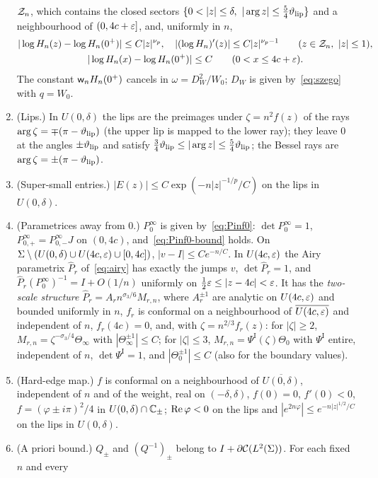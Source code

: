 \begin{proposition}
\begin{enumerate}
  $\Zn$, which contains the closed sectors $\{0<|z|\le\delta,\ |\arg z|\le\frac54\thlip\}$ and a neighbourhood of
  $(0,4c+\eps]$, and, uniformly in $n$,
  \begin{gather*}
    |\log H_n(z)-\log H_n(0^+)|\le C|z|^{\nu_p},\quad |(\log H_n)'(z)|\le C|z|^{\nu_p-1}\qquad(z\in\Zn,\ |z|\le1),\\
    |\log H_n(x)-\log H_n(0^+)|\le C\qquad(0<x\le4c+\eps).
  \end{gather*}
  The constant $\wn H_n(0^+)$ cancels in $\omega=D_W^2/W_0$; $D_W$ is given by~\eqref{eq:szego} with $q=W_0$.
\item[\Fi3] (Lips.) In $U(0,\delta)$ the lips are the preimages under $\zeta=n^2f(z)$ of the rays $\arg\zeta=\mp(\pi-\vartheta_{\mathrm{lip}})$
  (the upper lip is mapped to the lower ray); they leave $0$ at the angles $\pm\vartheta_{\mathrm{lip}}$ and satisfy
  $\frac34\vartheta_{\mathrm{lip}}\le|\arg z|\le\frac54\vartheta_{\mathrm{lip}}$; the Bessel rays are $\arg\zeta=\pm(\pi-\vartheta_{\mathrm{lip}})$.
\item[\Fi4] (Super-small entries.) $|E(z)|\le C\exp(-n|z|^{-1/p}/C)$ on the lips in $U(0,\delta)$.
\item[\Fi5] (Parametrices away from $0$.) $P^\infty_0$ is given by~\eqref{eq:Pinf0}: $\det P^\infty_0=1$, $P^\infty_{0,+}=
  P^\infty_{0,-}J$ on $(0,4c)$, and~\eqref{eq:Pinf0-bound} holds. On $\Sigma\setminus(U(0,\delta)\cup U(4c,\varepsilon)\cup[0,4c])$,
  $|v-I|\le Ce^{-n/C}$. In $U(4c,\varepsilon)$ the Airy parametrix $\hat P_r$ of~\eqref{eq:airy} has exactly the jumps $v$,
  $\det\hat P_r=1$, and $\hat P_r(P^\infty_0)^{-1}=I+O(1/n)$ uniformly on $\frac12\varepsilon\le|z-4c|<\varepsilon$. It has the
  \emph{two-scale structure} $\hat P_r=A_rn^{\sigma_3/6}M_{r,n}$, where $A_r^{\pm1}$ are analytic on $U(4c,\varepsilon)$ and bounded
  uniformly in $n$, $f_r$ is conformal on a neighbourhood of $\overline{U(4c,\varepsilon)}$ and independent of $n$, $f_r(4c)=0$, and,
  with $\zeta=n^{2/3}f_r(z)$: for $|\zeta|\ge2$, $M_{r,n}=\zeta^{-\sigma_3/4}\Theta_\infty$ with $|\Theta_\infty^{\pm1}|\le C$; for
  $|\zeta|\le3$, $M_{r,n}=\Psi^{\mathrm I}(\zeta)\Theta_0$ with $\Psi^{\mathrm I}$ entire, independent of $n$, $\det\Psi^{\mathrm I}=1$,
  and $|\Theta_0^{\pm1}|\le C$ (also for the boundary values).
\item[\Fi6] (Hard-edge map.) $f$ is conformal on a neighbourhood of $\overline{U(0,\delta)}$, independent of $n$ and of the
  weight, real on $(-\delta,\delta)$, $f(0)=0$, $f'(0)<0$, $f=(\varphi\pm i\pi)^2/4$ in $U(0,\delta)\cap\mathbb{C}_\pm$; $\operatorname{Re}\varphi<0$ on
  the lips and $|e^{2n\varphi}|\le e^{-n|z|^{1/2}/C}$ on the lips in $U(0,\delta)$.
\item[\Fi7] (A priori bound.) $Q_\pm$ and $(Q^{-1})_\pm$ belong to $I+\partial\mathcal{C}(L^2(\Sigma))$. For each fixed $n$ and every

\end{enumerate}
\end{proposition}
